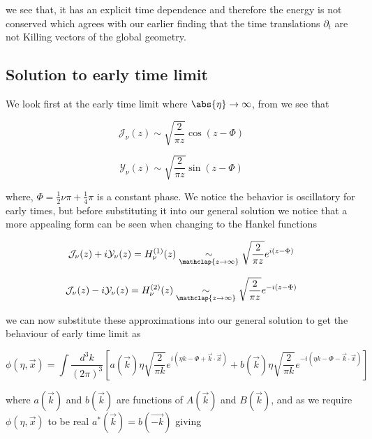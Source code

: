 \documentclass[a4paper,11pt]{article}
\newcommand\underrel[3][]{\mathrel{\mathop{#3}\limits_{%
      \ifx c#1\relax\mathclap{#2}\else#2\fi}}}
\numberwithin{equation}{section}
\numberwithin{figure}{section}
\begin{document}
\begin{large}
we see that, it has an explicit time dependence and therefore the energy is not conserved which agrees with our earlier finding that the time translations $\partial_t$ are not Killing vectors of the global geometry.


\subsection{Solution to early time limit}

We look first at the early time limit where $\abs{\eta}\rightarrow\infty$, from \cite{limitingform} we see that 

\begin{equation}
\label{J(z) z>>1}    
    \mathcal{J}_\nu(z)\sim \sqrt{\frac{2}{\pi z}}\cos(z-\Phi)
\end{equation}

\begin{equation}
\label{Y(z) z>>1}    
    \mathcal{Y}_\nu(z)\sim \sqrt{\frac{2}{\pi z}}\sin(z-\Phi)
\end{equation}

where, $\Phi=\frac{1}{2}\nu\pi+\frac{1}{4}\pi$ is a constant phase. We notice the behavior is oscillatory for early times, but before substituting it into our general solution we notice that a more appealing form can be seen when changing to the Hankel functions


\begin{equation}
\label{H1 z>>1}    
    \mathcal{J}_\nu(z)+i\mathcal{Y}_\nu(z)=H^{(1)}_\nu(z)\underrel[c]{z\to \infty}{\sim}\sqrt{\frac{2}{\pi z}}e^{i(z-\Phi)}
\end{equation}

\begin{equation}
\label{H2 z>>1}    
    \mathcal{J}_\nu(z)-i\mathcal{Y}_\nu(z)=H^{(2)}_\nu(z)\underrel[c]{z\to \infty}{\sim}\sqrt{\frac{2}{\pi z}}e^{-i(z-\Phi)}
\end{equation}

we can now substitute these approximations into our general solution to get the behaviour of early time limit as

\begin{equation}
\label{genKGsol1 eta>>1}    
    \phi(\eta,\Vec{x})=\int \frac{d^3k}{(2\pi)^3}\left[a(\Vec{k})\eta\sqrt{\frac{2}{\pi k}}e^{i(\eta k-\Phi+\Vec{k}\cdot\Vec{x})}+b(\Vec{k})\eta\sqrt{\frac{2}{\pi k}}e^{-i(\eta k-\Phi-\Vec{k}\cdot\Vec{x})} \right]
\end{equation}

where $a(\Vec{k})$ and $b(\Vec{k})$ are functions of $A(\Vec{k})$ and $B(\Vec{k})$, and as we require $\phi(\eta,\Vec{x})$ to be real $a^*(\Vec{k})=b(\Vec{-k})$ giving


\end{large}
\end{document}
